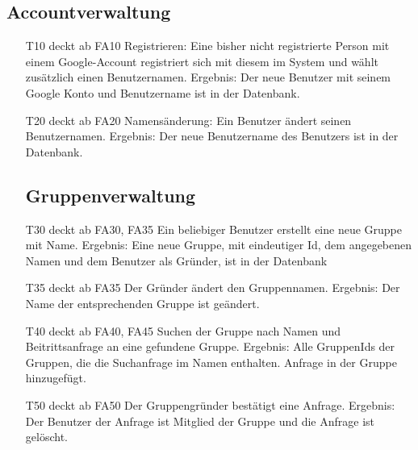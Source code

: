 \documentclass{scrartcl}
\begin{document}
	\subsection{Accountverwaltung}
	\begin{itemize} 
		\item[T10] deckt ab FA10 \newline
		Registrieren: Eine bisher nicht registrierte Person mit einem Google-Account registriert sich mit diesem im System 				und wählt zusätzlich einen Benutzernamen. \newline
		Ergebnis: Der neue Benutzer mit seinem Google Konto und Benutzername ist in der Datenbank.

		\item[T20] deckt ab FA20\newline
		Namensänderung: Ein Benutzer ändert seinen Benutzernamen. \newline
		Ergebnis: Der neue Benutzername des Benutzers ist in der Datenbank. 
	
	\subsection{Gruppenverwaltung}
	
		\item[T30] deckt ab FA30, FA35\newline
		 Ein beliebiger Benutzer erstellt eine neue Gruppe mit Name. \newline
		Ergebnis: Eine neue Gruppe, mit eindeutiger Id, dem angegebenen Namen und dem Benutzer als Gründer, ist in der 			Datenbank

		\item[T35] deckt ab FA35 \newline
		Der Gründer ändert den Gruppennamen.\newline
		Ergebnis: Der Name der entsprechenden Gruppe ist geändert.

		\item[T40] deckt ab FA40, FA45  \newline
		Suchen der Gruppe nach Namen und Beitrittsanfrage an eine gefundene Gruppe. \newline
		Ergebnis: Alle GruppenIds der Gruppen, die die Suchanfrage im Namen enthalten. Anfrage in der Gruppe 		
		hinzugefügt.

		\item[T50] deckt ab FA50  \newline
		Der Gruppengründer bestätigt eine Anfrage. \newline
		Ergebnis: Der Benutzer der Anfrage ist \gls{Mitglied} der Gruppe und die Anfrage ist gelöscht.


\end{itemize}
\end{document}
